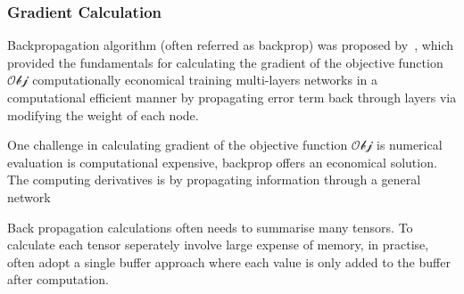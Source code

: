 \subsubsection{Gradient Calculation}
Backpropagation algorithm (often referred as backprop) was proposed by~\citet{werbos1975beyond}, which provided the fundamentals for calculating the gradient of the objective function $\mathcal{Obj}$ computationally economical training multi-layers networks in a computational efficient manner by propagating error term back through layers via modifying the weight of each node. 
\par
One challenge in calculating gradient of the objective function $\mathcal{Obj}$ is numerical evaluation is computational expensive, backprop offers an economical solution. The computing derivatives is by propagating information through a general network 
\par 
Back propagation calculations often needs to summarise many tensors. To calculate each tensor seperately involve large expense of memory, in practise, often adopt a single buffer approach where each value is only added to the buffer after computation.